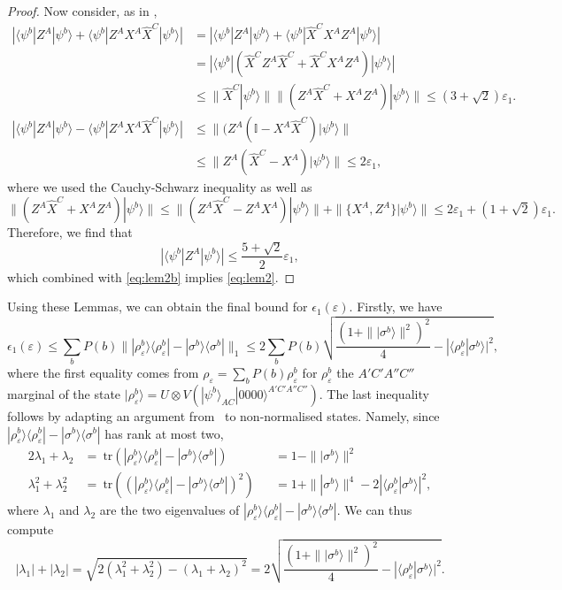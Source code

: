 \documentclass[onecolumn,prx,amsmath,amssymb]{revtex4-2}
\def\bra#1{\langle#1|} \def\ket#1{|#1\rangle}
\def\braket#1#2{\langle#1|#2\rangle}
\def\ketbra#1#2{\ket{#1}\!\bra{#2}}
\def\id{{\mathbb I}}
\def\tr{\mbox{tr}}
\def\norm#1{\| #1 \| }
\def\abs#1{|#1|}
\begin{document}
\begin{appendix}
\begin{proof}
\noindent  Now consider, as in \cite{singlet},
\begin{align*}
\abs{\bra{\psi^b}Z^A \ket{\psi^b}+\bra{\psi^b}Z^A X^A \hat{X}^C \ket{\psi^b}}
&=\abs{\bra{\psi^b}Z^A \ket{\psi^b}+\bra{\psi^b}\hat{X}^C X^A Z^A \ket{\psi^b}}\\
 &= \abs{\bra{\psi^b}(\hat{X}^C Z^A \hat{X}^C + \hat{X}^C X^A Z^A) \ket{\psi^b}} \\
&\leq \norm{\hat{X}^C \ket{\psi^b}} \norm{(Z^A \hat{X}^C +X^A Z^A) \ket{\psi^b}} \leq  (3+\sqrt{2})\varepsilon_1. \\
\abs{\bra{\psi^b}Z^A \ket{\psi^b}-\bra{\psi^b}Z^AX^A\hat{X}^C \ket{\psi^b}} &\leq \norm{(Z^A(\id - X^A \hat{X}^C)\ket{\psi^b}}\\
& \leq \norm{Z^A(\hat{X}^C-X^A) \ket{\psi^b}} \leq 2\varepsilon_1,
\end{align*}
where we used the Cauchy-Schwarz inequality as well as 
\[
\norm{(Z^A\hat{X}^C+ X^AZ^A) \ket{\psi^b}} \leq \norm{(Z^A\hat{X}^C-Z^AX^A)\ket{\psi^b}} + \norm{\{X^A,Z^A\}\ket{\psi^b}} \leq 2\varepsilon_1+(1+\sqrt{2})\varepsilon_1.
\]
Therefore, we find that \begin{equation}\label{ZA}
 \abs{\bra{\psi^b} Z^A \ket{\psi^b}}\leq \frac{5+\sqrt{2}}{2}\varepsilon_1,   
\end{equation} which combined with \eqref{eq:lem2b} implies \eqref{eq:lem2}.
\end{proof}

\bigskip

\noindent Using these Lemmas, we can obtain the final bound for $\epsilon_1(\varepsilon)$. Firstly, we have
\begin{equation}
\epsilon_1(\varepsilon) \leq \sum_b P(b) \norm{\ketbra{\rho_\varepsilon^b}{\rho_\varepsilon^b}-\ketbra{\sigma^b}{\sigma^b}}_1  \leq  2 \sum_b P(b) \sqrt{
\frac{(1+\norm{\ket{\sigma^b}}^2)^2}{4}-\abs{\braket{\rho_\varepsilon^b}{\sigma^b}}^2},
\end{equation}
where the first equality comes from $\rho_\varepsilon=\sum_b P(b) \rho_\varepsilon^b$ for $\rho_\varepsilon^b$ the $A'C'A''C''$ marginal of the state $\ket{\rho_\varepsilon^b}=U\otimes V(\ket{\psi^b}_{AC}\ket{0000}^{A'C'A''C''})$.
The last inequality follows by adapting an argument from~\cite{Watrous} to non-normalised states. Namely, since $\ketbra{\rho_\varepsilon^b}{\rho_\varepsilon^b}-\ketbra{\sigma^b}{\sigma^b}$ has rank at most two,
\begin{alignat}{2}
\lambda_1+\lambda_2&= \  \tr(\ketbra{\rho_\varepsilon^b}{\rho_\varepsilon^b}-\ketbra{\sigma^b}{\sigma^b}) &&= 1- \norm{\ket{\sigma^b}}^2 \nonumber\\
\lambda_1^2+\lambda_2^2 &= \ \tr((\ketbra{\rho_\varepsilon^b}{\rho_\varepsilon^b}-\ketbra{\sigma^b}{\sigma^b})^2) &&= 1+ \norm{\ket{\sigma^b}}^4-2\abs{\braket{\rho_\varepsilon^b}{\sigma^b}}^2, \nonumber
\end{alignat}
where $\lambda_1$ and $\lambda_2$ are the two eigenvalues of $\ketbra{\rho_\varepsilon^b}{\rho_\varepsilon^b}-\ketbra{\sigma^b}{\sigma^b}$. We can thus compute
$$\abs{\lambda_1}+\abs{\lambda_2}=\sqrt{2(\lambda_1^2+\lambda_2^2)-(\lambda_1+\lambda_2)^2}= 2\sqrt{
\frac{(1+\norm{\ket{\sigma^b}}^2)^2}{4}-\abs{\braket{\rho_\varepsilon^b}{\sigma^b}}^2}. $$



\end{appendix}
\end{document}
